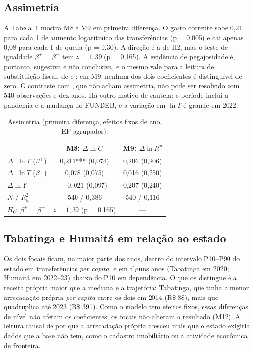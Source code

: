 \documentclass[10pt,twocolumn]{article}
\newcommand{\ep}[1]{{\scriptsize(#1)}}
\begin{document}
\subsection{Assimetria}
A Tabela~\ref{tab:asym} mostra M8 e M9 em primeira diferença. O gasto corrente sobe 0,21 para cada 1 de aumento logarítmico das transferências (p = 0,005) e cai apenas 0,08 para cada 1 de queda (p = 0,30). A direção é a de H2, mas o teste de igualdade $\beta^{+}=\beta^{-}$ tem $z=1{,}39$ (p = 0,165). A evidência de pegajosidade é, portanto, sugestiva e não conclusiva, e o mesmo vale para a leitura de substituição fiscal, de \citet{heyndels2001} e \citet{deller2006}: em M9, nenhum dos dois coeficientes é distinguível de zero. O contraste com \citet{gamkhar1996}, que não acham assimetria, não pode ser resolvido com 540 observações e dez anos. Há outro motivo de cautela: o período inclui a pandemia e a mudança do FUNDEB, e a variação em $\ln T$ é grande em 2022.

\begin{table}[t]
\centering\footnotesize
\caption{Assimetria (primeira diferença, efeitos fixos de ano, EP agrupados).}\label{tab:asym}
\setlength{\tabcolsep}{4pt}
\begin{tabular}{lcc}
\toprule
& M8: $\Delta\ln G$ & M9: $\Delta\ln R^p$\\
\midrule
$\Delta^{+}\ln T$ ($\beta^{+}$) & 0,211*** \ep{0,074} & 0,206 \ep{0,206}\\
$\Delta^{-}\ln T$ ($\beta^{-}$) & 0,078 \ep{0,075} & 0,016 \ep{0,250}\\
$\Delta\ln Y$ & $-0{,}021$ \ep{0,097} & 0,207 \ep{0,240}\\
$N$ / $R^2_w$ & 540 / 0,386 & 540 / 0,116\\
$H_0$: $\beta^{+}=\beta^{-}$ & $z=1{,}39$ (p = 0,165) & ---\\
\bottomrule
\end{tabular}
\end{table}

\subsection{Tabatinga e Humaitá em relação ao estado}
Os dois focais ficam, na maior parte dos anos, dentro do intervalo P10--P90 do estado em transferências \textit{per capita}, e em alguns anos (Tabatinga em 2020; Humaitá em 2022--23) abaixo do P10 em dependência. O que os distingue é a receita própria maior que a mediana e a trajetória: Tabatinga, que tinha a menor arrecadação própria \textit{per capita} entre os dois em 2014 (R\$ 88), mais que quadruplica até 2023 (R\$ 391). Como o modelo tem efeitos fixos, essas diferenças de nível não afetam os coeficientes; os focais não alteram o resultado (M12). A leitura causal de por que a arrecadação própria cresceu mais que o estado exigiria dados que a base não tem, como o cadastro imobiliário ou a atividade econômica de fronteira.
\end{document}

